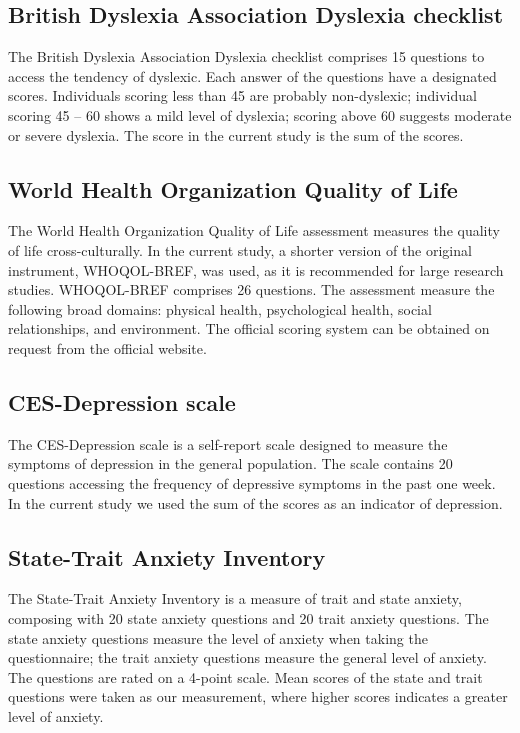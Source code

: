 \subsection{British Dyslexia Association Dyslexia checklist}
The British Dyslexia Association Dyslexia checklist \cite{Smythe2001} comprises 15 questions to access the tendency of dyslexic. Each answer of the questions have a designated scores. Individuals scoring less than 45 are probably non-dyslexic; individual scoring 45 – 60 shows a mild level of dyslexia; scoring above 60 suggests moderate or severe dyslexia. The score in the current study is the sum of the scores.

\subsection{World Health Organization Quality of Life}
The World Health Organization Quality of Life \cite{WHOQOL2002} assessment measures the quality of life cross-culturally.  In the current study, a shorter version of the original instrument, WHOQOL-BREF, was used, as it is recommended for large research studies. WHOQOL-BREF comprises 26 questions. The assessment measure the following broad domains: physical health, psychological health, social relationships, and environment. The official scoring system can be obtained on request from the official website.

\subsection{CES-Depression scale}
The CES-Depression scale \cite{Radloff1977} is a self-report scale designed to measure the symptoms of depression in the general population. The scale contains 20 questions accessing the frequency of depressive symptoms in the past one week. In the current study we used the sum of the scores as an indicator of depression.

\subsection{State-Trait Anxiety Inventory}
The State-Trait Anxiety Inventory \cite{Spielberger1987} is a measure of trait and state anxiety, composing with 20 state anxiety questions and 20 trait anxiety questions. The state anxiety questions measure the level of anxiety when taking the questionnaire; the trait anxiety questions measure the general level of anxiety. The questions are rated on a 4-point scale. Mean scores of the state and trait questions were taken as our measurement, where higher scores indicates a greater level of anxiety.


